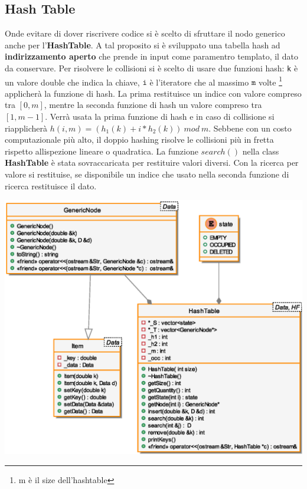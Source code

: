 \subsection{Hash Table}
Onde evitare di dover riscrivere codice si \`e scelto di sfruttare
il nodo generico anche per l'\textbf{HashTable}. A tal proposito
si \`e sviluppato una tabella hash ad \textbf{indirizzamento aperto} che
prende in input come paramentro templato, il dato da conservare.
Per risolvere le collisioni si \`e scelto di usare due funzioni hash:
\texttt{k} \`e un valore double che indica
la chiave, $\texttt{i}$ \`e l'iteratore che al massimo 
$\texttt{m}$ volte \footnote{m \`e il size dell'hashtable}  
applicher\`a la funzione di hash. La prima restituisce un indice con valore compreso
tra $[0, m]$, mentre la seconda funzione di hash un valore compreso tra $[1, m-1]$. 
Verr\`a usata la prima funzione di hash e in caso di collisione
si riapplicher\`a
$h(i, m) = (h_1(k) + i * h_2(k)) \ mod \ m$. Sebbene con un costo 
computazionale pi\`u alto, il doppio hashing risolve le collisioni
pi\`u in fretta rispetto allispezione lineare o quadratica.\newline \indent 
La funzione $search()$ nella class \textbf{HashTable}
\`e stata sovraccaricata per restituire valori diversi. Con la 
ricerca per valore si restituise, se disponibile un indice che 
usato nella seconda funzione di ricerca restituisce il dato.

\begin{center}
\includegraphics[scale=0.7]{src/rbhash/2img/hash.eps}
\end{center}

